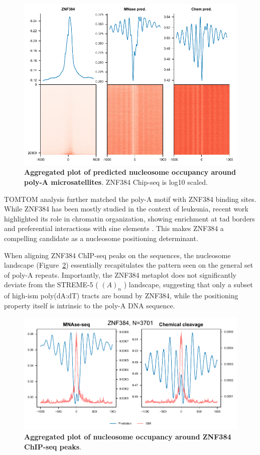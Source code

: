 \documentclass[11pt]{book}
\begin{document}
\begin{figure}[htbp]
    \centering
    \includegraphics[width=\textwidth, height=0.4\textheight]{Figures/Results/polyA_meta.pdf}
    \caption{\textbf{Aggregated plot of predicted nucleosome occupancy around poly-A microsatellites}. ZNF384 Chip-seq is log10 scaled.}
    \label{fig:polyA_meta}
\end{figure}

TOMTOM analysis further matched the poly-A motif with ZNF384 binding sites. While ZNF384 has been mostly studied in the context of leukemia, recent work highlighted its role in chromatin organization, showing enrichment at \gls{tad} borders and preferential interactions with \gls{sine} elements \cite{vargas_identification_2025}. This makes ZNF384 a compelling candidate as a nucleosome positioning determinant.

When aligning ZNF384 ChIP-seq peaks on the sequences, the nucleosome landscape (Figure~\ref{fig:metachip_znf384}) essentially recapitulates the pattern seen on the general set of poly-A repeats. Importantly, the ZNF384 metaplot does not significantly deviate from the STREME-5 ( $(A)_n$ ) landscape, suggesting that only a subset of high-\gls{ism} poly(dA:dT) tracts are bound by ZNF384, while the positioning property itself is intrinsic to the poly-A DNA sequence.

\begin{figure}[htbp]
    \centering
    \includegraphics[width=\textwidth]{Figures/Results/znf384_chip.pdf}
    \caption{\textbf{Aggregated plot of nucleosome occupancy around ZNF384 ChIP-seq peaks}. }
    \label{fig:metachip_znf384}
\end{figure}
\end{document}

